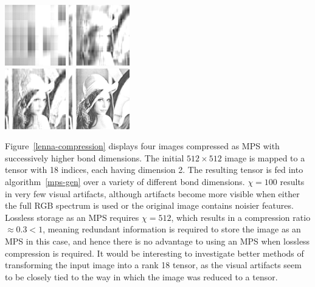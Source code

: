 \documentclass[12pt]{article}
\newenvironment{Figure}
  {\par\medskip\noindent\minipage{\linewidth}}
  {\endminipage\par\medskip}
\begin{document}
\begin{multicols}{2}
	\begin{Figure}
		\center\includegraphics[height=100px]{./Figures/lenna-chi-2.png}
		\includegraphics[height=100px]{./Figures/lenna-chi-9.png}\\
		\includegraphics[height=100px]{./Figures/lenna-chi-20.png}
		\includegraphics[height=100px]{./Figures/lenna-chi-100.png}
		\label{lenna-compression}
	\end{Figure}

	Figure~\ref{lenna-compression} displays four images compressed as MPS with successively higher bond dimensions. The initial $512\times512$ image is mapped to a tensor with 18 indices, each having dimension 2. The resulting tensor is fed into algorithm~\ref{mps-gen} over a variety of different bond dimensions. $\chi=100$ results in very few visual artifacts, although artifacts become more visible when either the full RGB spectrum is used or the original image contains noisier features. Lossless storage as an MPS requires $\chi=512$, which results in a compression ratio $\approx0.3<1$, meaning redundant information is required to store the image as an MPS in this case, and hence there is no advantage to using an MPS when lossless compression is required. It would be interesting to investigate better methods of transforming the input image into a rank 18 tensor, as the visual artifacts seem to be closely tied to the way in which the image was reduced to a tensor.


\end{multicols}
\end{document}
